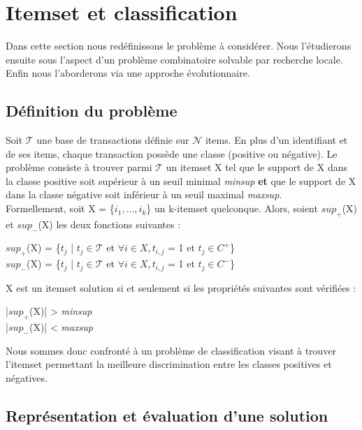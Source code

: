 \documentclass[a4paper,10pt]{report}
\begin{document}
\newpage

\section{Itemset et classification}

	Dans cette section nous redéfinissons le problème à considérer. Nous l'étudierons ensuite sous l'aspect d'un problème combinatoire solvable par recherche locale. Enfin nous l'aborderons via une approche évolutionnaire. \\

\subsection{Définition du problème}
	Soit $\mathcal{T}$ une base de transactions définie sur $\mathcal{N}$ items. En plus d'un identifiant et de ses items, chaque transaction possède une classe (positive ou négative). Le problème consiste à trouver parmi $\mathcal{T}$ un itemset X tel que le support de X dans la classe positive soit supérieur à un seuil minimal \emph{minsup} \textbf{et} que le support de X dans la classe négative soit inférieur à un seuil maximal \emph{maxsup}. \\

	Formellement, soit X = \{$i_{1}, ..., i_{k}$\} un k-itemset quelconque. Alors, soient \textbf{$sup_{+}$}(X) et \textbf{$sup_{-}$}(X) les deux fonctions suivantes : 
\begin{center}
\textbf{$sup_{+}$}(X) = \{$t_{j}$ | $t_{j} \in \mathcal{T}$ et $\forall i \in X,  t_{i,j}$ = 1 et $t_{j} \in C^{+}$\}\\ 
\textbf{$sup_{-}$}(X) = \{$t_{j}$ | $t_{j} \in \mathcal{T}$ et $\forall i \in X,  t_{i,j}$ = 1 et $t_{j} \in C^{-}$\}\\ 
\end{center}
X est un itemset solution si et seulement si les propriétés suivantes sont vérifiées : 
\begin{center}
|\textbf{$sup_{+}$}(X)| > \emph{minsup}\\
|\textbf{$sup_{-}$}(X)| < \emph{maxsup}\\
\end{center}

Nous sommes donc confronté à un problème de classification visant à trouver l'itemset permettant la meilleure discrimination entre les classes positives et négatives. 

\subsection{Représentation et évaluation d'une solution}
\end{document}
